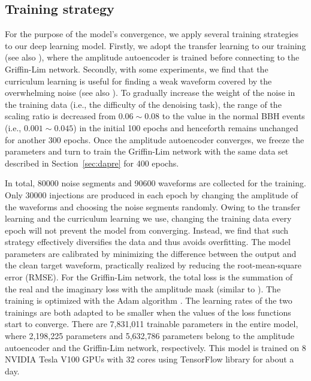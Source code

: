 \documentclass[preprint,12pt]{elsarticle}
\begin{document}
\subsection{Training strategy}
For the purpose of the model's convergence, we apply several training strategies to our deep learning model. 
Firstly, we adopt the transfer learning to our training (see also \cite{george2018paraest, murali2023detecting}), where the amplitude autoencoder is trained before connecting to the Griffin-Lim network.
Secondly, with some experiments, we find that the curriculum learning is useful for finding a weak waveform covered by the overwhelming noise (see also \cite{george2018paraest}). 
To gradually increase the weight of the noise in the training data (i.e., the difficulty of the denoising task), the range of the scaling ratio is decreased from $0.06\sim0.08$ to the value in the normal BBH events (i.e., $0.001\sim0.045$) in the initial 100 epochs and henceforth remains unchanged for another 300 epochs. 
Once the amplitude autoencoder converges, we freeze the parameters and turn to train the Griffin-Lim network with the same data set described in Section~\ref{sec:dapre} for 400 epochs.

In total, 80000 noise segments and 90600 waveforms are collected for the training.
Only 30000 injections are produced in each epoch by changing the amplitude of the waveforms and choosing the noise segments randomly.
Owing to the transfer learning and the curriculum learning we use, changing the training data every epoch will not prevent the model from converging.
Instead, we find that such strategy effectively diversifies the data and thus avoids overfitting.
The model parameters are calibrated by minimizing the difference between the output and the clean target waveform, practically realized by reducing the root-mean-square error (RMSE). 
For the Griffin-Lim network, the total loss is the summation of the real and the imaginary loss with the amplitude mask (similar to \cite{wang2024waveformer}). 
The training is optimized with the Adam algorithm \cite{kingma2014adam}. 
The learning rates of the two trainings are both adapted to be smaller when the values of the loss functions start to converge. 
There are 7,831,011 trainable parameters in the entire model, where 2,198,225 parameters and 5,632,786 parameters belong to the amplitude autoencoder and the Griffin-Lim network, respectively. 
This model is trained on 8 NVIDIA Tesla V100 GPUs with 32 cores using TensorFlow library \cite{abadi2016tensorflow} for about a day.
\end{document}
